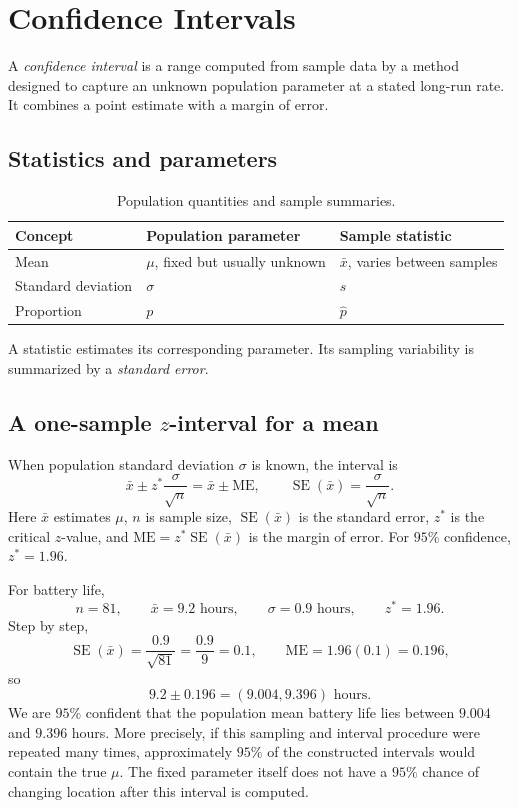 \documentclass[11pt]{article}
\newcommand{\SE}{\operatorname{SE}}
\begin{document}
\section{Confidence Intervals}\label{sec:ci}
A \emph{confidence interval} is a range computed from sample data by a method
designed to capture an unknown population parameter at a stated long-run
rate.  It combines a point estimate with a margin of error.

\subsection{Statistics and parameters}
\begin{table}[ht]
\centering
\caption{Population quantities and sample summaries.}
\begin{tabularx}{\textwidth}{@{}lYY@{}}
\toprule
Concept & Population parameter & Sample statistic \\
\midrule
Mean & $\mu$, fixed but usually unknown & $\bar{x}$, varies between samples \\
Standard deviation & $\sigma$ & $s$ \\
Proportion & $p$ & $\widehat p$ \\
\bottomrule
\end{tabularx}
\end{table}
A statistic estimates its corresponding parameter.  Its sampling variability
is summarized by a \emph{standard error}.

\subsection{A one-sample \texorpdfstring{$z$}{z}-interval for a mean}
When population standard deviation $\sigma$ is known, the interval is
\begin{equation}\label{eq:zinterval}
\bar{x}\pm z^*\frac{\sigma}{\sqrt n}
=\bar{x}\pm \mathrm{ME},
\qquad \SE(\bar{x})=\frac{\sigma}{\sqrt n}.
\end{equation}
Here $\bar{x}$ estimates $\mu$, $n$ is sample size, $\SE(\bar{x})$ is the
standard error, $z^*$ is the critical $z$-value, and
$\mathrm{ME}=z^*\SE(\bar{x})$ is the margin of error.  For $95\%$ confidence,
$z^*=1.96$.

For battery life,
\[
n=81,\qquad \bar{x}=9.2\text{ hours},\qquad
\sigma=0.9\text{ hours},\qquad z^*=1.96.
\]
Step by step,
\[
\SE(\bar{x})=\frac{0.9}{\sqrt{81}}=\frac{0.9}{9}=0.1,
\qquad \mathrm{ME}=1.96(0.1)=0.196,
\]
so
\[
9.2\pm0.196=(9.004,9.396)\text{ hours}.
\]
We are $95\%$ confident that the population mean battery life lies between
$9.004$ and $9.396$ hours.  More precisely, if this sampling and interval
procedure were repeated many times, approximately $95\%$ of the constructed
intervals would contain the true $\mu$.  The fixed parameter itself does not
have a $95\%$ chance of changing location after this interval is computed.
\end{document}
